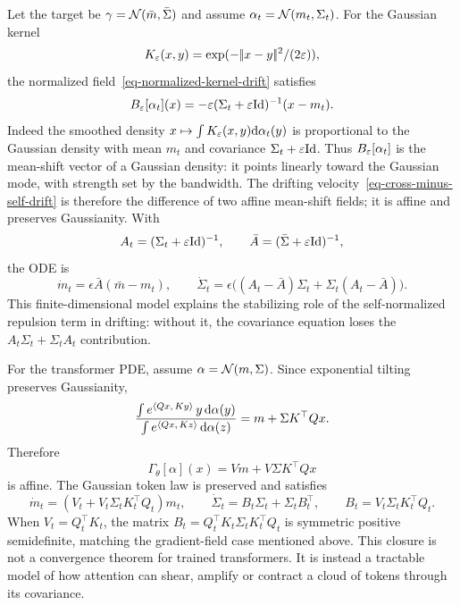 \begin{example}
	Let the target be $\gamma=\mathcal{N}(\bar m,\bar\Sigma)$ and assume $\alpha_t=\mathcal{N}(m_t,\Sigma_t)$. For the Gaussian kernel
	\[
		K_\varepsilon(x,y)=\exp(-|\!| x-y |\!|^2/(2\varepsilon)),
	\]
	the normalized field~\eqref{eq-normalized-kernel-drift} satisfies
	\[
		B_\varepsilon[\alpha_t](x)
		=
		-\varepsilon(\Sigma_t+\varepsilon\mathrm{Id})^{-1}(x-m_t).
	\]
	Indeed the smoothed density \(x\mapsto\int K_\varepsilon(x,y)\mathrm{d}\alpha_t(y)\) is proportional to the Gaussian density with mean $m_t$ and covariance $\Sigma_t+\varepsilon\mathrm{Id}$. Thus \(B_\varepsilon[\alpha_t]\) is the mean-shift vector of a Gaussian density: it points linearly toward the Gaussian mode, with strength set by the bandwidth. The drifting velocity~\eqref{eq-cross-minus-self-drift} is therefore the difference of two affine mean-shift fields; it is affine and preserves Gaussianity. With
	\[
		A_t=(\Sigma_t+\varepsilon\mathrm{Id})^{-1},
		\qquad
		\bar A=(\bar\Sigma+\varepsilon\mathrm{Id})^{-1},
	\]
	the ODE is
	\[
		\dot m_t=\epsilon\bar A(\bar m-m_t),
		\qquad
		\dot\Sigma_t=\epsilon\bigl((A_t-\bar A)\Sigma_t+\Sigma_t(A_t-\bar A)\bigr).
	\]
	This finite-dimensional model explains the stabilizing role of the self-normalized repulsion term in drifting: without it, the covariance equation loses the $A_t\Sigma_t+\Sigma_tA_t$ contribution.
\end{example}

\begin{example}
	For the transformer PDE, assume $\alpha=\mathcal{N}(m,\Sigma)$. Since exponential tilting preserves Gaussianity,
	\[
		\frac{\int e^{\langle Qx,\,Ky\rangle}\,y\,\mathrm{d}\alpha(y)}
		     {\int e^{\langle Qx,\,Kz\rangle}\,\mathrm{d}\alpha(z)}
		=
		m+\Sigma K^\top Qx.
	\]
	Therefore
	\[
		\Gamma_\theta[\alpha](x)=Vm+V\Sigma K^\top Qx
	\]
	is affine. The Gaussian token law is preserved and satisfies
	\[
		\dot m_t=(V_t+V_t\Sigma_tK_t^\top Q_t)m_t,
		\qquad
		\dot\Sigma_t=B_t\Sigma_t+\Sigma_tB_t^\top,
		\qquad
		B_t=V_t\Sigma_tK_t^\top Q_t.
	\]
	When $V_t=Q_t^\top K_t$, the matrix $B_t=Q_t^\top K_t\Sigma_tK_t^\top Q_t$ is symmetric positive semidefinite, matching the gradient-field case mentioned above.
	This closure is not a convergence theorem for trained transformers. It is instead a tractable model of how attention can shear, amplify or contract a cloud of tokens through its covariance.
\end{example}

